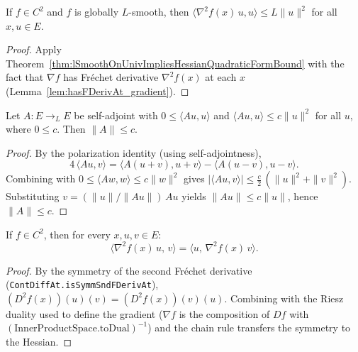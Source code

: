 \begin{lemma}\label{lem:lSmooth_imp_hessian_ub}
  \leanok{}
  If $f \in C^2$ and $f$ is globally $L$-smooth, then
  $\langle \nabla^2 f(x)\, u, u\rangle \le L\|u\|^2$ for all $x, u \in E$.
\end{lemma}

\begin{proof}
  \leanok{}
  Apply Theorem~\ref{thm:lSmoothOnUnivImpliesHessianQuadraticFormBound} with the
  fact that $\nabla f$ has Fr\'echet derivative $\nabla^2 f(x)$ at each $x$
  (Lemma~\ref{lem:hasFDerivAt_gradient}).
\end{proof}

\begin{lemma}\label{lem:opNorm_le_of_inner_le_of_symm_of_nonneg}
  \leanok{}
  \uses{}
  Let $A : E \to_L E$ be self-adjoint with $0 \le \langle A u, u\rangle$ and
  $\langle A u, u\rangle \le c\|u\|^2$ for all $u$, where $0 \le c$. Then $\|A\| \le c$.
\end{lemma}

\begin{proof}
  \leanok{}
  By the polarization identity (using self-adjointness),
  \[
    4\,\langle A u, v\rangle = \langle A(u+v), u+v\rangle - \langle A(u-v), u-v\rangle.
  \]
  Combining with $0 \le \langle A w, w\rangle \le c\|w\|^2$ gives
  $|\langle A u, v\rangle| \le \tfrac{c}{2}\,(\|u\|^2 + \|v\|^2)$.
  Substituting $v = (\|u\|/\|A u\|)\,A u$ yields $\|A u\| \le c\|u\|$, hence $\|A\| \le c$.
\end{proof}

\begin{lemma}\label{lem:hessian_isSymmetric}
  \leanok{}
  If $f \in C^2$, then for every $x, u, v \in E$:
  \[
    \langle \nabla^2 f(x)\, u,\, v\rangle = \langle u,\, \nabla^2 f(x)\, v\rangle.
  \]
\end{lemma}

\begin{proof}
  \leanok{}
  By the symmetry of the second Fr\'echet derivative
  (\texttt{ContDiffAt.isSymmSndFDerivAt}), $(D^2 f(x))(u)(v) = (D^2 f(x))(v)(u)$.
  Combining with the Riesz duality used to define the gradient ($\nabla f$ is
  the composition of $Df$ with $(\mathrm{InnerProductSpace.toDual})^{-1}$) and
  the chain rule transfers the symmetry to the Hessian.
\end{proof}

